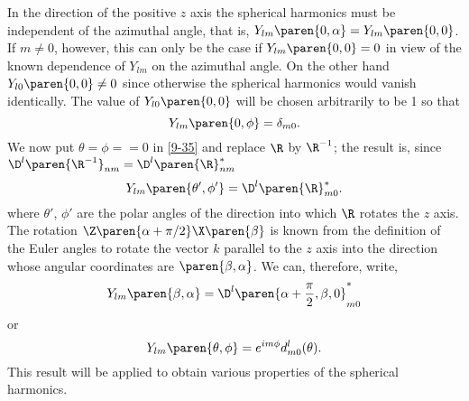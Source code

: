 In the direction of the positive $z$ axis the spherical harmonics must be independent of the azimuthal angle, that is, $Y_{lm}\paren{0, \alpha} = Y_{lm}\paren{0, 0}$. If $m\ne0$, however, this can only be the case if $Y_{lm}\paren{0, 0} = 0$ in view of the known dependence of $Y_{lm}$ on the azimuthal angle. On the other hand $Y_{l0}\paren{0, 0} \ne 0$ since otherwise the spherical harmonics would vanish identically. The value of $Y_{l0}\paren{0, 0}$ will be chosen arbitrarily to be 1 so that
  \begin{equation}
    Y_{lm}\paren{0, \phi} = \delta_{m0} .
    \label{9-37}
  \end{equation}
We now put $\theta = \phi == 0$ in \eqref{9-35} and replace $\R$ by $\R^{-1}$; the result is, since $\D^{l}\paren{\R^{-1}}_{nm} = \D^{l}\paren{\R}_{nm}^{*}${\rd{,}}
  \begin{equation*}
    Y_{lm}\paren{\theta', \phi'} = \D^{l}\paren{\R}_{m0}^{*} .
  \end{equation*}
where $\theta'$, $\phi'$ are the polar angles of the direction into which $\R$ rotates the $z$ axis. The rotation $\Z\paren{\alpha + \pi/2} \X\paren{\beta}$ is known from the definition of the Euler angles to rotate the vector $k$ parallel to the $z$ axis into the direction whose angular coordinates are $\paren{\beta, \alpha}$. We can, therefore, write,	
  \begin{equation}
    Y_{lm}\paren{\beta, \alpha} = \D^{l}\paren{\alpha+\frac{\pi}{2},\beta,0}_{m0}^{*}
    \label{9-38}
  \end{equation}
or
  \begin{equation}
    Y_{lm}\paren{\theta, \phi} = e^{i m \phi} d^{l}_{m0}(\theta) .
    \label{9-39}
  \end{equation}
This result will be applied to obtain various properties of the spherical harmonics.


\endinput  %